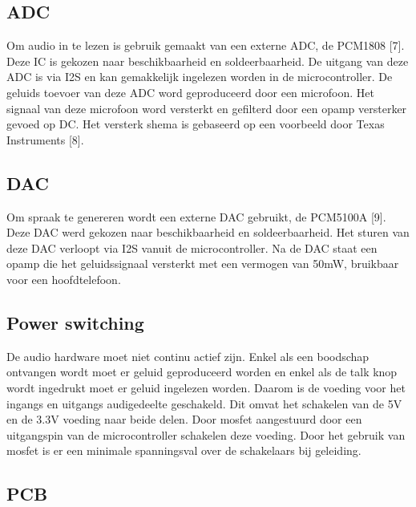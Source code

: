 \subsection{ADC}

Om audio in te lezen is gebruik gemaakt van een externe ADC, de PCM1808 [7].
Deze IC is gekozen naar beschikbaarheid en soldeerbaarheid. 
De uitgang van deze ADC is via I2S en kan gemakkelijk ingelezen worden in de microcontroller.
De geluids toevoer van deze  ADC word geproduceerd door een microfoon.
 Het signaal van deze microfoon word versterkt en gefilterd door een opamp versterker gevoed op DC.
Het versterk shema is gebaseerd op een voorbeeld door Texas Instruments [8].

\subsection{DAC}

Om spraak te genereren wordt een  externe DAC gebruikt, de PCM5100A [9].
Deze DAC werd gekozen naar beschikbaarheid en soldeerbaarheid.
Het sturen van deze DAC verloopt via I2S vanuit de microcontroller.
Na de DAC staat een opamp die het geluidssignaal versterkt met een 
vermogen van 50mW, bruikbaar voor een hoofdtelefoon.

\subsection{Power switching}

De audio hardware moet niet continu actief zijn. 
Enkel als een boodschap ontvangen wordt moet er geluid geproduceerd worden en 
enkel als de talk knop wordt ingedrukt moet er geluid ingelezen worden.
Daarom is de voeding voor het ingangs en uitgangs audigedeelte geschakeld. 
Dit omvat het schakelen van de 5V en de 3.3V voeding naar beide delen.
Door mosfet aangestuurd door een uitgangspin van de microcontroller schakelen deze voeding.
Door het gebruik van mosfet is er een minimale spanningsval over de schakelaars bij geleiding.

\subsection{PCB}



